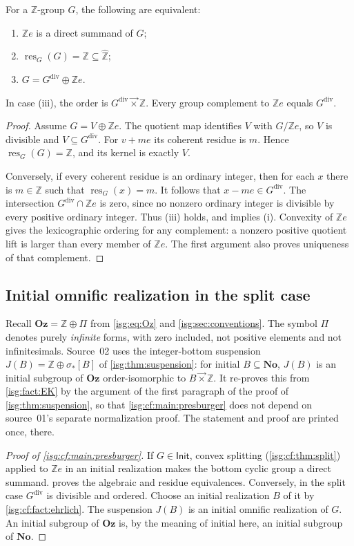\documentclass[11pt]{article}
\theoremstyle{definition}
\theoremstyle{remark}
\newcommand{\No}{\ensuremath{\mathbf{No}}}
\newcommand{\Oz}{\ensuremath{\mathbf{Oz}}}
\newcommand{\Z}{\mathbb{Z}}
\newcommand{\lex}{\mathbin{\overrightarrow{\times}}}
\newcommand{\Zhat}{\widehat{\Z}}
\newcommand{\IR}{\mathsf{Init}}
\newcommand{\res}{\operatorname{res}}
\newcommand{\dv}{\mathrm{div}}
\begin{document}
\begin{proposition}\label{isg:cf:prop:residuesplit}
For a $\Z$-group $G$, the following are equivalent:
\begin{enumerate}[label=\textup{(\roman*)}]
\item $\Z e$ is a direct summand of $G$;
\item $\res_G(G)=\Z\subseteq\Zhat$;
\item $G=G^{\dv}\oplus\Z e$.
\end{enumerate}
In case \textup{(iii)}, the order is $G^{\dv}\lex\Z$. Every group
complement to $\Z e$ equals $G^{\dv}$.
\end{proposition}
\begin{proof}
Assume $G=V\oplus\Z e$. The quotient map identifies $V$ with
$G/\Z e$, so $V$ is divisible and $V\subseteq G^{\dv}$. For $v+me$
its coherent residue is $m$. Hence $\res_G(G)=\Z$, and its kernel is
exactly $V$.

Conversely, if every coherent residue is an ordinary integer, then for
each $x$ there is $m\in\Z$ such that $\res_G(x)=m$.
It follows that $x-me\in G^{\dv}$. The intersection
$G^{\dv}\cap\Z e$ is zero, since no nonzero ordinary integer is divisible
by every positive ordinary integer. Thus (iii) holds, and implies (i).
Convexity of $\Z e$ gives the lexicographic ordering for any complement:
a nonzero positive quotient lift is larger than every member of
$\Z e$. The first argument also proves uniqueness of that complement.
\end{proof}

\subsection{Initial omnific realization in the split case}
Recall $\Oz=\Z\oplus\Pi$ from \eqref{isg:eq:Oz} and
\cref{isg:sec:conventions}. The symbol $\Pi$ denotes purely
\emph{infinite} forms, with zero included, not positive elements and not
infinitesimals. Source~02 uses the integer-bottom suspension
$J(B)=\Z\oplus\sigma_*[B]$ of \cref{isg:thm:suspension}: for initial
$B\subseteq\No$, $J(B)$ is an initial subgroup of $\Oz$ order-isomorphic
to $B\lex\Z$. It re-proves this from \cref{isg:fact:EK} by the argument of
the first paragraph of the proof of \cref{isg:thm:suspension}, so that
\cref{isg:cf:main:presburger} does not depend on source~01's separate
normalization proof. The statement and proof are printed once, there.

\begin{proof}[Proof of \cref{isg:cf:main:presburger}]
If $G\in\IR$, convex splitting (\cref{isg:cf:thm:split}) applied to
$\Z e$ in an initial realization makes the bottom cyclic group a direct
summand.  proves the algebraic and residue
equivalences. Conversely, in the split case $G^{\dv}$ is divisible and
ordered. Choose an initial realization $B$ of it by
\cref{isg:cf:fact:ehrlich}. The suspension $J(B)$ is an initial omnific
realization of $G$. An initial subgroup of $\Oz$ is, by the meaning of
initial here, an initial subgroup of $\No$.
\end{proof}
\end{document}
